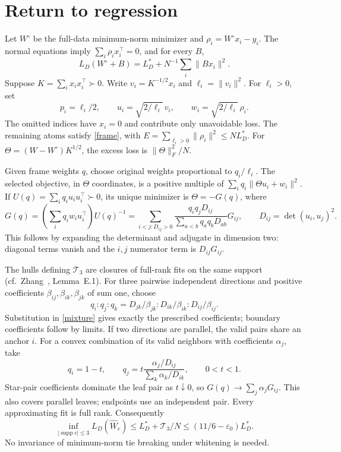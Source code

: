 \documentclass[10pt]{article}
\newcommand{\supp}{\operatorname{supp}}
\newcommand{\T}{\mathcal T_3}
\begin{document}
\section{Return to regression}
Let $W^\circ$ be the full-data minimum-norm minimizer and
$\rho_i=W^\circ x_i-y_i$. The normal equations imply
$\sum_i\rho_ix_i^\top=0$, and for every $B$,
\[
 L_D(W^\circ+B)=L_D^*+N^{-1}\sum_i\|Bx_i\|^2.
\]
Suppose $K=\sum_i x_ix_i^\top\succ0$.
Write $v_i=K^{-1/2}x_i$ and $\ell_i=\|v_i\|^2$.
For $\ell_i>0$, set
\[
 p_i=\ell_i/2,\qquad u_i=\sqrt{2/\ell_i}\,v_i,\qquad
 w_i=\sqrt{2/\ell_i}\,\rho_i.
\]
The omitted indices have $x_i=0$ and contribute only unavoidable loss.
The remaining atoms satisfy \eqref{frame}, with $E=\sum_{\ell_i>0}\|\rho_i\|^2\le NL_D^*$.
For $\Theta=(W-W^\circ)K^{1/2}$, the excess loss is $\|\Theta\|_F^2/N$.

Given frame weights $q$, choose original weights proportional to $q_i/\ell_i$.
The selected objective, in $\Theta$ coordinates, is a positive multiple of
$\sum_iq_i\|\Theta u_i+w_i\|^2$. If $U(q)=\sum_iq_i u_iu_i^\top\succ0$,
its unique minimizer is $\Theta=-G(q)$, where
\begin{equation}\label{mixture}
 G(q)=\left(\sum_iq_iw_iu_i^\top\right)U(q)^{-1}
 =\sum_{i<j:D_{ij}>0}\frac{q_iq_jD_{ij}}{\sum_{a<b}q_aq_bD_{ab}}G_{ij},
 \qquad D_{ij}=\det(u_i,u_j)^2.
\end{equation}
This follows by expanding the determinant and adjugate in dimension two:
diagonal terms vanish and the $i,j$ numerator term is $D_{ij}G_{ij}$.

The hulls defining $\T$ are closures of full-rank fits on the same support
(cf.\ Zhang~\cite{zhang}, Lemma~E.1).
For three pairwise independent directions and positive coefficients
$\beta_{ij},\beta_{ik},\beta_{jk}$ of sum one, choose
\[
 q_i:q_j:q_k=
 D_{jk}/\beta_{jk}:D_{ik}/\beta_{ik}:D_{ij}/\beta_{ij}.
\]
Substitution in \eqref{mixture} gives exactly the prescribed coefficients;
boundary coefficients follow by limits. If two directions are parallel, the valid pairs share an anchor $i$.
For a convex combination of its valid neighbors with coefficients
$\alpha_j$, take
\[
 q_i=1-t,\qquad q_j=t\frac{\alpha_j/D_{ij}}{\sum_k\alpha_k/D_{ik}},
 \qquad 0<t<1.
\]
Star-pair coefficients dominate the leaf pair as $t\downarrow0$, so
$G(q)\to\sum_j\alpha_jG_{ij}$. This also covers parallel leaves;
endpoints use an independent pair. Every approximating fit is full rank.
Consequently
\[
 \inf_{|\supp c|\le3}L_D(\widehat W_c)
 \le L_D^*+\T/N\le(11/6-\varepsilon_0)L_D^*.
\]
No invariance of minimum-norm tie breaking under whitening is needed.
\end{document}
